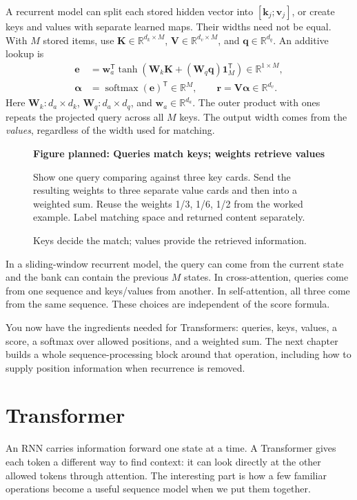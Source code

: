 \documentclass[11pt, oneside]{book}
\newcommand{\R}{\mathbb{R}}
\newcommand{\T}{^{\mathsf{T}}}           %
\DeclareMathOperator{\softmax}{softmax}
\newcommand{\figureplaceholder}[5]{%
\begin{figure}[htbp]
\centering
\begin{tcolorbox}[unbreakable,width=\linewidth,height=#1,colback=accent!3,
  colframe=accent!30,boxrule=0.5pt,arc=2.5mm,sharp corners=all,
  valign=center,halign=center,fontupper=\small]
{\bfseries\color{accent}Figure planned: #2}\par\medskip
{\color{gray!75!black}#3}
\end{tcolorbox}
\caption{#4}\label{#5}
\end{figure}}
\begin{document}
A recurrent model can split each stored hidden vector into $[\mathbf{k}_j;\mathbf{v}_j]$, or create keys and values with separate learned maps. Their widths need not be equal. With $M$ stored items, use $\mathbf{K}\in\R^{d_k\times M}$, $\mathbf{V}\in\R^{d_v\times M}$, and $\mathbf{q}\in\R^{d_q}$. An additive lookup is
\begin{align*}
 \mathbf{e}&=\mathbf{w}_a\T\tanh\!\left(\mathbf{W}_k\mathbf{K}
                     +(\mathbf{W}_q\mathbf{q})\mathbf{1}_M\T\right)\in\R^{1\times M},\\
 \boldsymbol{\alpha}&=\softmax(\mathbf{e})\T\in\R^M,\qquad
 \mathbf{r}=\mathbf{V}\boldsymbol{\alpha}\in\R^{d_v}.
\end{align*}
Here $\mathbf{W}_k:d_a\times d_k$, $\mathbf{W}_q:d_a\times d_q$, and $\mathbf{w}_a\in\R^{d_a}$. The outer product with ones repeats the projected query across all $M$ keys. The output width comes from the \emph{values}, regardless of the width used for matching.

\figureplaceholder{3.2cm}{Queries match keys; weights retrieve values}{Show one query comparing against three key cards. Send the resulting weights to three separate value cards and then into a weighted sum. Reuse the weights 1/3, 1/6, 1/2 from the worked example. Label matching space and returned content separately.}{Keys decide the match; values provide the retrieved information.}{fig:query-key-value}

In a sliding-window recurrent model, the query can come from the current state and the bank can contain the previous $M$ states. In cross-attention, queries come from one sequence and keys/values from another. In self-attention, all three come from the same sequence. These choices are independent of the score formula.

You now have the ingredients needed for Transformers: queries, keys, values, a score, a softmax over allowed positions, and a weighted sum. The next chapter builds a whole sequence-processing block around that operation, including how to supply position information when recurrence is removed.

\chapter{Transformer}\label{ch:source-5}
An RNN carries information forward one state at a time. A Transformer gives each token a different way to find context: it can look directly at the other allowed tokens through attention. The interesting part is how a few familiar operations become a useful sequence model when we put them together.
\end{document}
